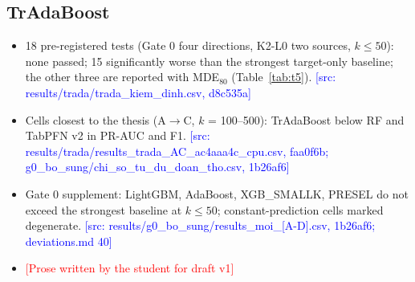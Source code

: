 \documentclass[conference]{IEEEtran}
\newcommand{\todoSV}[1]{\textcolor{red}{[#1]}}
\newcommand{\src}[1]{\textcolor{blue}{\scriptsize[src: #1]}}
\begin{document}
\subsection{TrAdaBoost}
\begin{table}[!t]\centering\scriptsize
\caption{\todoSV{TrAdaBoost caption}}\label{tab:t5}


\medskip

\end{table}
\begin{itemize}
  \item 18 pre-registered tests (Gate 0 four directions, K2-L0 two sources, $k \le 50$): none passed; 15 significantly worse than the strongest target-only baseline; the other three are reported with MDE$_{80}$ (Table~\ref{tab:t5}). \src{results/trada/trada\_kiem\_dinh.csv, d8c535a}
  \item Cells closest to the thesis (A$\to$C, $k$ = 100--500): TrAdaBoost below RF and TabPFN v2 in PR-AUC and F1. \src{results/trada/results\_trada\_AC\_ac4aaa4c\_cpu.csv, faa0f6b; g0\_bo\_sung/chi\_so\_tu\_du\_doan\_tho.csv, 1b26af6}
  \item Gate 0 supplement: LightGBM, AdaBoost, XGB\_SMALLK, PRESEL do not exceed the strongest baseline at $k \le 50$; constant-prediction cells marked degenerate. \src{results/g0\_bo\_sung/results\_moi\_[A-D].csv, 1b26af6; deviations.md 40}
  \item \todoSV{Prose written by the student for draft v1}
\end{itemize}

\end{document}
